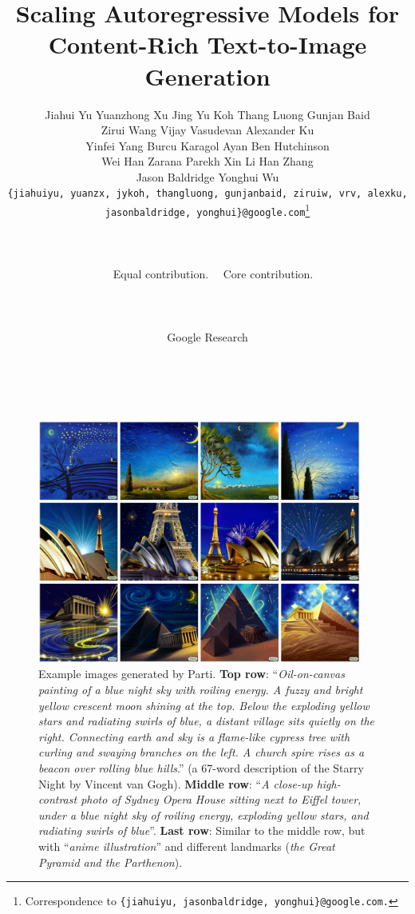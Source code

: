 \documentclass{article}
\title{Scaling Autoregressive Models for Content-Rich Text-to-Image Generation}
\author{
\parbox{\linewidth}{\centering

Jiahui Yu\footnotemark[1]\hspace{.4cm}
Yuanzhong Xu\footnotemark[2]\hspace{.4cm}
Jing Yu Koh\footnotemark[2]\hspace{.4cm}
Thang Luong\footnotemark[2]\hspace{.4cm}
Gunjan Baid\footnotemark[2]\\
Zirui Wang\footnotemark[2]\hspace{.7cm}
Vijay Vasudevan\footnotemark[2]\hspace{.7cm}
Alexander Ku\footnotemark[2]\\

Yinfei Yang\hspace{.2cm}
Burcu Karagol Ayan\hspace{.2cm}
Ben Hutchinson
\\
Wei Han\hspace{.2cm}
Zarana Parekh\hspace{.2cm}
Xin Li\hspace{.2cm}
Han Zhang\hspace{.2cm}\\

Jason Baldridge\footnotemark[2]\hspace{.8cm}
Yonghui Wu\footnotemark[1]
\\
\texttt{\small{\{jiahuiyu, yuanzx, jykoh, thangluong, gunjanbaid, ziruiw, vrv, alexku,\\ jasonbaldridge, yonghui\}@google.com}}\thanks{Correspondence to \texttt{\small{\{jiahuiyu, jasonbaldridge, yonghui\}}@google.com.}}
\\
}\\

\parbox{\linewidth}{\centering \vspace{0.2cm}
\footnotemark[1] \ \ Equal contribution.\hspace{1cm}
\footnotemark[2] \ \ Core contribution.\\
}\\

\parbox{\linewidth}{\centering \vspace{0.2cm}
   Google Research \\
}\\
}
\newcommand{\babeldraw}{Parti\xspace}
\newcommand{\bdraw}{\babeldraw} %
\begin{document}
\maketitle

\begin{figure}[tbh!]
    \centering
    \includegraphics[width=0.95\textwidth]{figures/teaser.jpg}
    \caption{Example images generated by \bdraw. \textbf{Top row}: ``{\it Oil-on-canvas painting of a blue night sky with roiling energy. A fuzzy and bright yellow crescent moon shining at the top. Below the exploding yellow stars and radiating swirls of blue, a distant village sits quietly on the right. Connecting earth and sky is a flame-like cypress tree with curling and swaying branches on the left. A church spire rises as a beacon over rolling blue hills}.'' (a 67-word description of the Starry Night by Vincent van Gogh). \textbf{Middle row}: ``{\it A close-up high-contrast photo of Sydney Opera House sitting next to Eiffel tower, under a blue night sky of roiling energy, exploding yellow stars, and radiating swirls of blue}''. \textbf{Last row}: Similar to the middle row, but with ``{\it anime illustration}'' and different landmarks ({\it the Great Pyramid and the Parthenon}).}
    \label{figs:teaser}
\end{figure}
\end{document}
